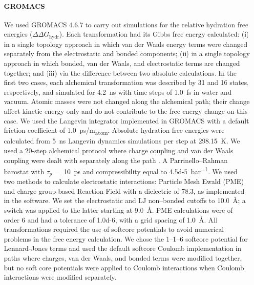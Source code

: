 \documentclass[journal=jctcce,manuscript=article]{achemso}
\begin{document}
\paragraph{GROMACS} We used GROMACS 4.6.7 to carry out simulations for 
the relative hydration free energies ($\Delta \Delta G_{\mathrm{hydr}}$).
Each transformation had its Gibbs free energy calculated: (i) in a single 
topology approach in which van der Waals energy terms were changed separately 
from the electrostatic and bonded components; (ii) in a single topology 
approach in which bonded, van der Waals, and electrostatic terms are changed 
together;  and (iii) via the difference between two absolute calculations.
In the first two cases, each alchemical transformation was described by 31 and 
16 states, respectively, and simulated for \SI{4.2}{ns} with time steps of 
\SI{1.0}{fs} in water and vacuum. Atomic masses were not changed along the 
alchemical path;
their change affect kinetic energy only and do not contribute to the free 
energy change on this case. 
We used the Langevin integrator implemented in GROMACS with a 
default friction coefficient of \SI{1.0}{ps/m_{atom}}. 
Absolute hydration free energies were calculated from \SI{5}{ns} Langevin 
dynamics simulations per step at \SI{298.15}{K}. We used a 20-step alchemical protocol where charge  coupling and van der Waals coupling were dealt with separately along the path  \cite{Mobley2014, doi:10.1021/acs.jced.7b00104}.
A Parrinello--Rahman barostat with $\tau_p =$ \SI{10}{ps} and compressibility 
equal to \SI{4.5d-5}{bar^{-1}}.
We used two methods to calculate electrostatic interactions: Particle Mesh 
Ewald (PME) and charge group-based Reaction Field with a dielectric of 78.3, 
as implemented in the software. 
We set the electrostatic and LJ non--bonded cutoffs to \SI{10.0}{\angstrom};
a switch was applied to the latter starting at \SI{9.0}{\angstrom}. 
PME calculations were of order 6 and had a 
tolerance of \num{1.0d-6}, with a grid spacing of \SI{1.0}{\angstrom}. 
All transformations required the use of softcore potentials to avoid numerical 
problems in the free energy calculation.  We chose the 1--1--6 softcore 
potential for Lennard-Jones terms and used the default softcore Coulomb 
implementation in paths where charges, van der Waals, and bonded terms were 
modified together, but no soft core potentials were applied to Coulomb 
interactions when Coulomb interactions were modified separately.
\end{document}
